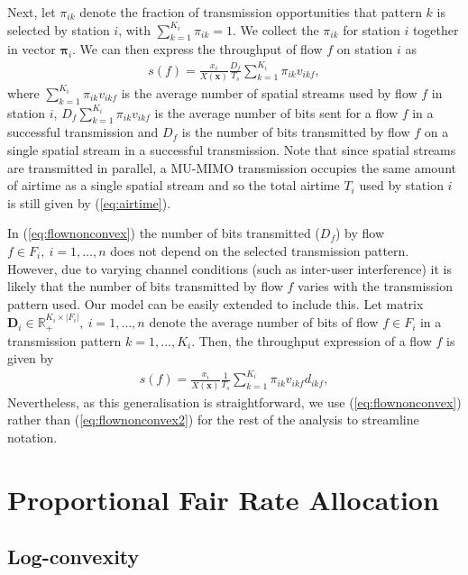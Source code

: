 \documentclass[11pt]{amsart}
\def\m#1{\mathbf{#1}}
\begin{document}
Next, let $\pi_{ik}$ denote the fraction of transmission opportunities that pattern $k$ is selected by station $i$, with $\sum_{k=1}^{K_i}\pi_{ik}=1$.  We collect the $\pi_{ik}$ for station $i$ together in vector $\boldsymbol \pi_i$. We can then express the throughput of flow $f$ on station $i$ as 
\begin{align}
s(f) = \frac{x_i}{X(\m{x})}\frac{D_f}{T_s} \sum_{k=1}^{K_i} \pi_{ik}  v_{ikf}   \label{eq:flownonconvex},
\end{align}
where $\sum_{k=1}^{K_i} \pi_{ik}  v_{ikf}$ is the average number of spatial streams used by flow $f$ in station $i$, $D_f \sum_{k=1}^{K_i} \pi_{ik}  v_{ikf}$ is the average number of bits sent for a flow $f$ in a successful transmission and $D_f$ is the number of bits transmitted by flow $f$ on a single spatial stream in a successful transmission. Note that since spatial streams are transmitted in parallel, a MU-MIMO transmission occupies the same amount of airtime as a single spatial stream and so the total airtime $T_i$ used by station $i$ is still given by (\ref{eq:airtime}).

In (\ref{eq:flownonconvex}) the number of bits transmitted ($D_f$) by flow $f\in F_i, \ i=1,\dots,n$ does not depend on the selected transmission pattern. However,  due to varying channel conditions (such as inter-user interference) it is  likely that the number of bits transmitted by flow $f$ varies with the transmission pattern used.  Our model can be easily extended to include this.  Let matrix $\m{D}_i \in \mathbb R_+^{K_i \times |F_i|}, \ i=1,\dots,n$ denote the average number of bits of flow $f \in F_i$ in a transmission pattern $k=1,\dots,K_i$. Then, the throughput expression of a flow $f$ is given by
\begin{align}
s(f) = \frac{x_i}{X(\m{x})}\frac{1}{T_s} \sum_{k=1}^{K_i} \pi_{ik}  v_{ikf} d_{ikf}, \label{eq:flownonconvex2}
\end{align}
Nevertheless, as this generalisation is straightforward, we use (\ref{eq:flownonconvex}) rather than (\ref{eq:flownonconvex2}) for the rest of the analysis to streamline notation.

\section{Proportional Fair Rate Allocation}
\subsection{Log-convexity}
\end{document}
